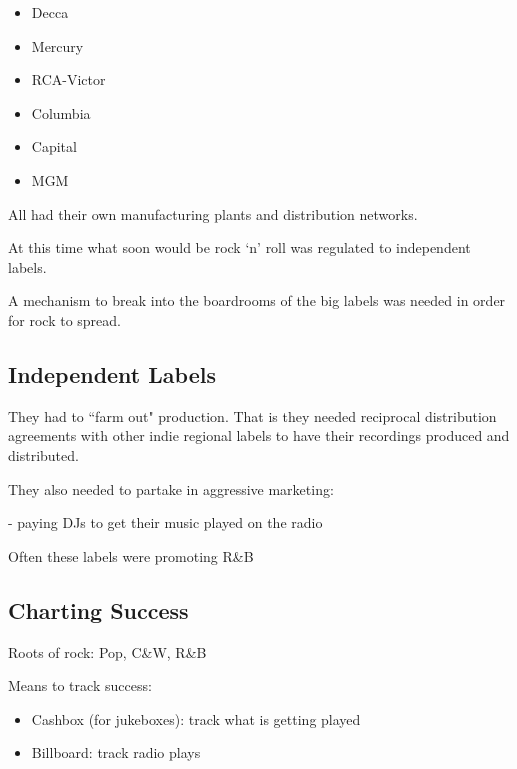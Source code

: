 \documentclass[12pt, a4paper, twoside, openright, titlepage]{book}
\begin{document}
\begin{itemize}
    \item Decca 
    \item Mercury 
    \item RCA-Victor 
    \item Columbia 
    \item Capital 
    \item MGM
\end{itemize}

All had their own manufacturing plants and distribution networks.

\begin{note}{}{}
    At this time what soon would be rock `n' roll was regulated to independent labels.


    A mechanism to break into the boardrooms of the big labels was needed in order for rock to spread.
\end{note}

\subsection{Independent Labels}

They had to ``farm out" production. That is they needed reciprocal distribution agreements with other indie regional labels to have their recordings produced and distributed.

They also needed to partake in aggressive marketing:

\begin{eg}{}{}
     - paying DJs to get their music played on the radio
\end{eg}

Often these labels were promoting R\&B


\subsection{Charting Success}

\begin{rec}{}{}
    Roots of rock: Pop, C\&W, R\&B
\end{rec}

Means to track success: 
\begin{itemize}
    \item Cashbox (for jukeboxes): track what is getting played
    \item Billboard: track radio plays
\end{itemize}
\end{document}
